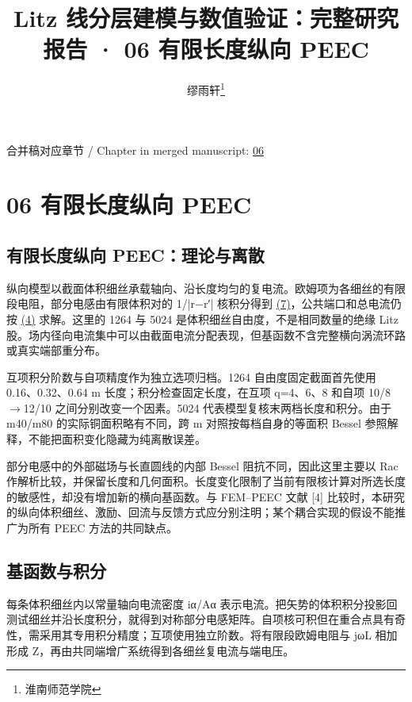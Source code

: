 \documentclass[journal,10pt]{IEEEtran}
\begin{document}
\title{Litz 线分层建模与数值验证：完整研究报告 · 06 有限长度纵向 PEEC}
\author{缪雨轩\thanks{淮南师范学院}}

\maketitle
\noindent 合并稿对应章节 / Chapter in merged manuscript: \href{report_zh-CN_ieee.pdf#chapter-06}{06}\par
\FloatBarrier
\section*{06 有限长度纵向 PEEC}
\hypertarget{chapter-06}{}
\subsection*{有限长度纵向 PEEC：理论与离散}
\hypertarget{06.peec_method.heading}{}
纵向模型以截面体积细丝承载轴向、沿长度均匀的复电流。欧姆项为各细丝的有限段电阻，部分电感由有限体积对的 1/|r−r′| 核积分得到 \href{report_zh-CN_ieee.pdf#E08}{(7)}，公共端口和总电流仍按 \href{report_zh-CN_ieee.pdf#E04}{(4)} 求解。这里的 1264 与 5024 是体积细丝自由度，不是相同数量的绝缘 Litz 股。场内径向电流集中可以由截面电流分配表现，但基函数不含完整横向涡流环路或真实端部重分布。


互项积分阶数与自项精度作为独立选项归档。1264 自由度固定截面首先使用 0.16、0.32、0.64 m 长度；积分检查固定长度，在互项 q=4、6、8 和自项 10/8\(\to\)12/10 之间分别改变一个因素。5024 代表模型复核末两档长度和积分。由于 m40/m80 的实际铜面积略有不同，跨 m 对照按每档自身的等面积 Bessel 参照解释，不能把面积变化隐藏为纯离散误差。


部分电感中的外部磁场与长直圆线的内部 Bessel 阻抗不同，因此这里主要以 Rac 作解析比较，并保留长度和几何面积。长度变化限制了当前有限核计算对所选长度的敏感性，却没有增加新的横向基函数。与 FEM–PEEC 文献 [4] 比较时，本研究的纵向体积细丝、激励、回流与反馈方式应分别注明；某个耦合实现的假设不能推广为所有 PEEC 方法的共同缺点。


\subsection*{基函数与积分}
\hypertarget{06.peec_derivation.heading}{}
每条体积细丝内以常量轴向电流密度 iα/Aα 表示电流。把矢势的体积积分投影回测试细丝并沿长度积分，就得到对称部分电感矩阵。自项核可积但在重合点具有奇性，需采用其专用积分精度；互项使用独立阶数。将有限段欧姆电阻与 jωL 相加形成 Z，再由共同端增广系统得到各细丝复电流与端电压。
\end{document}
